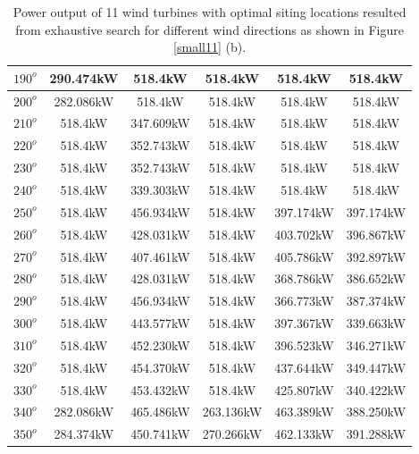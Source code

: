 \begin{table}[H]
\begin{tabular}{|c|c|c|c|c|c|}
        		$190^o$	& 290.474kW	& 518.4kW	& 518.4kW	& 518.4kW	& 518.4kW	\\ \hline
        		$200^o$	& 282.086kW	& 518.4kW	& 518.4kW	& 518.4kW	& 518.4kW	\\ \hline
        		$210^o$	& 518.4kW	& 347.609kW	& 518.4kW	& 518.4kW	& 518.4kW	\\ \hline
        		$220^o$	& 518.4kW	& 352.743kW	& 518.4kW	& 518.4kW	& 518.4kW	\\ \hline
        		$230^o$	& 518.4kW	& 352.743kW	& 518.4kW	& 518.4kW	& 518.4kW	\\ \hline
        		$240^o$	& 518.4kW	& 339.303kW	& 518.4kW	& 518.4kW	& 518.4kW	\\ \hline
        		$250^o$	& 518.4kW	& 456.934kW	& 518.4kW	& 397.174kW	& 397.174kW	\\ \hline
        		$260^o$	& 518.4kW	& 428.031kW	& 518.4kW	& 403.702kW	& 396.867kW	\\ \hline
        		$270^o$	& 518.4kW	& 407.461kW	& 518.4kW	& 405.786kW	& 392.897kW	\\ \hline
        		$280^o$	& 518.4kW	& 428.031kW	& 518.4kW	& 368.786kW	& 386.652kW	\\ \hline
        		$290^o$	& 518.4kW	& 456.934kW	& 518.4kW	& 366.773kW	& 387.374kW	\\ \hline
        		$300^o$	& 518.4kW	& 443.577kW	& 518.4kW	& 397.367kW	& 339.663kW	\\ \hline
        		$310^o$	& 518.4kW	& 452.230kW	& 518.4kW	& 396.523kW	& 346.271kW	\\ \hline
        		$320^o$	& 518.4kW	& 454.370kW	& 518.4kW	& 437.644kW	& 349.447kW	\\ \hline
        		$330^o$	& 518.4kW	& 453.432kW	& 518.4kW	& 425.807kW	& 340.422kW	\\ \hline
        		$340^o$	& 282.086kW	& 465.486kW	& 263.136kW	& 463.389kW	& 388.250kW	\\ \hline
        		$350^o$	& 284.374kW	& 450.741kW	& 270.266kW	& 462.133kW	& 391.288kW	\\ \hline
        	\end{tabular}
        	\caption{Power output of 11 wind turbines with optimal siting locations resulted from exhaustive search for different wind directions as shown in Figure \ref{small11} (b).}
        	\label{table11b}
        \end{table}
        \doublespacing
        
